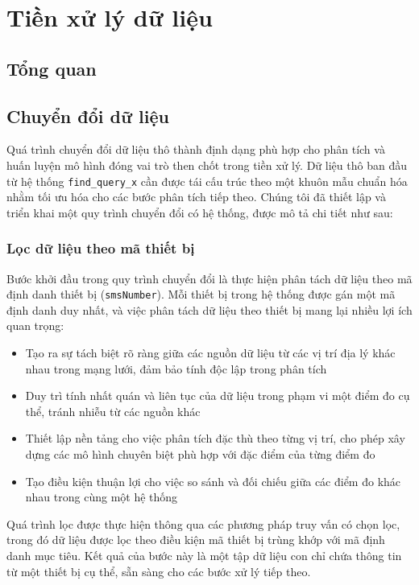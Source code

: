 \section{Tiền xử lý dữ liệu}
\subsection{Tổng quan}

\subsection{Chuyển đổi dữ liệu}
Quá trình chuyển đổi dữ liệu thô thành định dạng phù hợp cho phân tích và huấn luyện mô hình đóng vai trò then chốt trong tiền xử lý. Dữ liệu thô ban đầu từ hệ thống \texttt{find\_query\_x} cần được tái cấu trúc theo một khuôn mẫu chuẩn hóa nhằm tối ưu hóa cho các bước phân tích tiếp theo. Chúng tôi đã thiết lập và triển khai một quy trình chuyển đổi có hệ thống, được mô tả chi tiết như sau:

\subsubsection{Lọc dữ liệu theo mã thiết bị}
Bước khởi đầu trong quy trình chuyển đổi là thực hiện phân tách dữ liệu theo mã định danh thiết bị (\texttt{smsNumber}). Mỗi thiết bị trong hệ thống được gán một mã định danh duy nhất, và việc phân tách dữ liệu theo thiết bị mang lại nhiều lợi ích quan trọng:

\begin{itemize}
    \item Tạo ra sự tách biệt rõ ràng giữa các nguồn dữ liệu từ các vị trí địa lý khác nhau trong mạng lưới, đảm bảo tính độc lập trong phân tích
    \item Duy trì tính nhất quán và liên tục của dữ liệu trong phạm vi một điểm đo cụ thể, tránh nhiễu từ các nguồn khác
    \item Thiết lập nền tảng cho việc phân tích đặc thù theo từng vị trí, cho phép xây dựng các mô hình chuyên biệt phù hợp với đặc điểm của từng điểm đo
    \item Tạo điều kiện thuận lợi cho việc so sánh và đối chiếu giữa các điểm đo khác nhau trong cùng một hệ thống
\end{itemize}

Quá trình lọc được thực hiện thông qua các phương pháp truy vấn có chọn lọc, trong đó dữ liệu được lọc theo điều kiện mã thiết bị trùng khớp với mã định danh mục tiêu. Kết quả của bước này là một tập dữ liệu con chỉ chứa thông tin từ một thiết bị cụ thể, sẵn sàng cho các bước xử lý tiếp theo.

